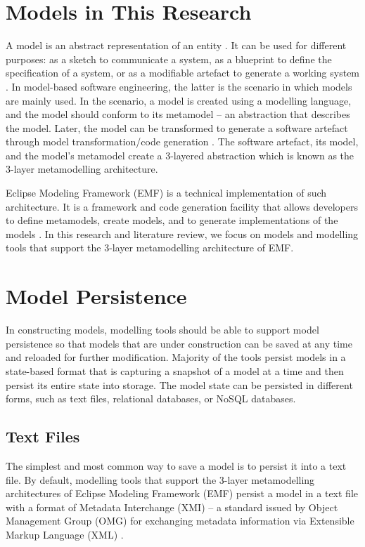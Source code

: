 \section{Models in This Research}
\label{sec:models_in_this_research)}

A model is an abstract representation of an entity \cite{volter2013model}. It can be used for different purposes: as a sketch to communicate a system, as a blueprint to define the specification of a system, or as a modifiable artefact to generate a working system \cite{fowler2019umlmode}. In model-based software engineering, the latter is the scenario in which models are mainly used. 
In the scenario, a model is created using a modelling language, and the model should conform to its metamodel -- an abstraction that describes the model. Later, the model can be transformed to generate a software artefact through model transformation/code generation \cite{brambilla2012model}. The software artefact, its model, and the model's metamodel create a 3-layered abstraction which is known as the 3-layer metamodelling architecture.  

Eclipse Modeling Framework (EMF) \cite{steinberg2008emf} is a technical implementation of such architecture. It is a framework and code generation facility that allows developers to define metamodels, create models, and to generate implementations of the models \cite{steinberg2008emf}. In this research and literature review, we focus on models and modelling tools that support the 3-layer metamodelling architecture of EMF.

\section{Model Persistence}
\label{sec:model_persistence}
In constructing models, modelling tools should be able to support model persistence so that models that are under construction can be saved at any time and reloaded for further modification. Majority of the tools persist models in a state-based format that is capturing a snapshot of a model at a time and then persist its entire state into storage. The model state can be persisted in different forms, such as text files, relational databases, or NoSQL databases.

\subsection{Text Files}
\label{sec:text_file}
The simplest and most common way to save a model is to persist it into a text file. By default, modelling tools that support the 3-layer metamodelling architectures of Eclipse Modeling Framework (EMF) \cite{steinberg2008emf} persist a model in a text file with a format of Metadata Interchange (XMI) -- a standard issued by Object Management Group (OMG) for exchanging metadata information via Extensible Markup Language (XML) \cite{omg2018xmi}. 

